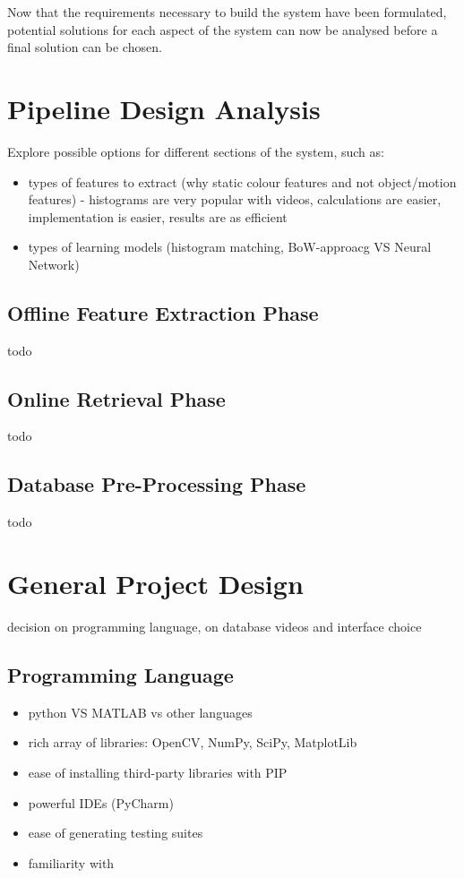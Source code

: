 Now that the requirements necessary to build the system have been formulated, potential solutions for each aspect of the system can now be analysed before a final solution can be chosen.

\section{Pipeline Design Analysis}

Explore possible options for different sections of the system, such as:
    \begin{itemize}
        \item types of features to extract (why static colour features and not object/motion features) - histograms are very popular with videos, calculations are easier, implementation is easier, results are as efficient
        \item types of learning models (histogram matching, BoW-approacg VS Neural Network)
    \end{itemize}

\subsection{Offline Feature Extraction Phase}

todo

\subsection{Online Retrieval Phase}

todo

\subsection{Database Pre-Processing Phase}

todo

\section{General Project Design}

decision on programming language, on database videos and interface choice

\subsection{Programming Language}

\begin{itemize}
	\item python VS MATLAB vs other languages
	\item rich array of libraries: OpenCV, NumPy, SciPy, MatplotLib
	\item ease of installing third-party libraries with PIP
	\item powerful IDEs (PyCharm)
	\item ease of generating testing suites
     \item familiarity with
\end{itemize}

